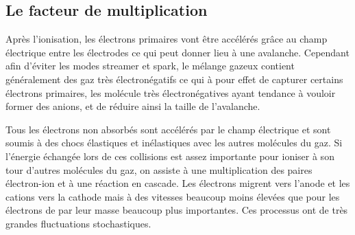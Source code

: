 \subsection{Le facteur de multiplication}
Après l'ionisation, les électrons primaires vont être accélérés grâce au champ électrique entre les électrodes ce qui peut donner lieu à une avalanche. Cependant afin d'éviter les modes streamer et spark, le mélange gazeux contient généralement des gaz très électronégatifs ce qui à pour effet de capturer certains électrons primaires, les molécule très électronégatives ayant tendance à vouloir former des anions, et de réduire ainsi la taille de l'avalanche. 

Tous les électrons non absorbés sont accélérés par le champ électrique et sont soumis à des chocs élastiques et inélastiques avec les autres molécules du gaz. Si l'énergie échangée lors de ces collisions est assez importante pour ioniser à son tour d'autres molécules du gaz, on assiste à une multiplication des paires électron-ion et à une réaction en cascade. Les électrons migrent vers l'anode et les cations vers la cathode mais à des vitesses beaucoup moins élevées que pour les électrons de par leur masse beaucoup plus importantes. Ces processus ont de très grandes fluctuations stochastiques.

